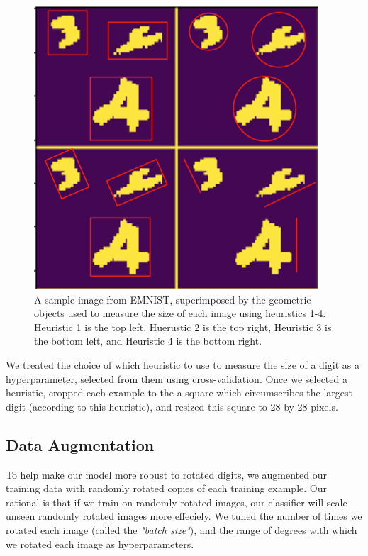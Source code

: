 \documentclass[letterpaper, 10 pt, conference]{ieeeconf}  %
\begin{document}
\begin{figure}[H]
      \centering
      \includegraphics[scale = 1]{size_definitions}
		\centering
      \caption{A sample image from EMNIST, superimposed by the geometric objects used to measure the size of each image using heuristics 1-4. Heuristic 1 is the top left, Huerustic 2 is the top right, Heuristic 3 is the bottom left, and Heuristic 4 is the bottom right.}
      \label{figurelabel}
   \end{figure}

We treated the choice of which heuristic to use to measure the size of a digit as a hyperparameter, selected from them using cross-validation. Once we selected a heuristic, cropped each example to the a square which circumscribes the largest digit (according to this heuristic), and resized this square to 28 by 28 pixels. 

\subsection{Data Augmentation} 

To help make our model more robust to rotated digits, we augmented our training data with randomly rotated copies of each training example. Our rational is that if we train on randomly rotated images, our classifier will scale unseen randomly rotated images more effeciely. We tuned the number of times we rotated each image (called the \emph{"batch size"}), and the range of degrees with which we rotated each image as hyperparameters. 
\end{document}

